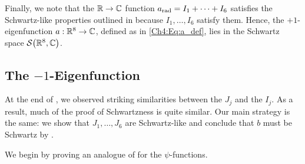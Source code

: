 Finally, we note that the $\mathbb{R} \to \mathbb{C}$ function $a_{\operatorname{rad}} = I_1 + \cdots + I_6$ satisfies the Schwartz-like properties outlined in  because $I_1, \ldots, I_6$ satisfy them. Hence, the $+1$-eigenfunction $a : \mathbb{R}^8 \to \mathbb{C}$, defined as in \eqref{Ch4:Eq:a_def}, lies in the Schwartz space $\mathcal{S}\!\left( \mathbb{R}^8, \mathbb{C} \right)$.

\subsection{The $-1$-Eigenfunction}
\label{Ch4:Subec:Schwartzness_b}

At the end of , we observed striking similarities between the $J_j$ and the $I_j$. As a result, much of the proof of Schwartzness is quite similar. Our main strategy is the same: we show that $J_1, \ldots, J_6$ are Schwartz-like and conclude that $b$ must be Schwartz by .

We begin by proving an analogue of  for the $\psi$-functions.

